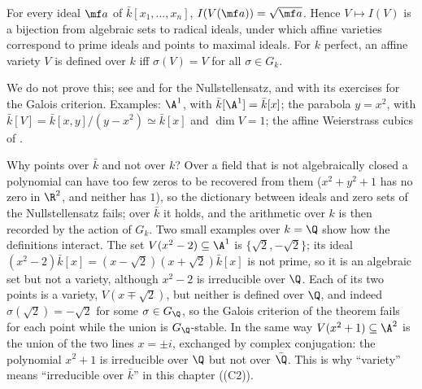 \begin{theorem}\label{thm:curves:nullstellensatz}
For every ideal $\mf a$ of $\bar k[x_1,\dots,x_n]$, $I(V(\mf a))=\sqrt{\mf a}$. Hence $V\mapsto I(V)$ is a bijection from algebraic sets to radical ideals, under
which affine varieties correspond to prime ideals and points to maximal ideals. For $k$ perfect, an affine variety $V$ is defined over $k$ iff
$\sigma(V)=V$ for all $\sigma\in G_k$.
\end{theorem}

We do not prove this; see \cite[Chapter 1]{Fulton} and \cite[Chapter I, Section 1]{Hartshorne} for the Nullstellensatz, and
\cite[Chapter I, Section 1]{SilvermanAEC} with its exercises for the Galois criterion. Examples: $\A^1$, with $\bar k[\A^1]=\bar k[x]$; the
parabola $y=x^2$, with $\bar k[V]=\bar k[x,y]/(y-x^2)\simeq\bar k[x]$ and $\dim V=1$; the affine Weierstrass cubics of .

Why points over $\bar k$ and not over $k$? Over a field that is not algebraically closed a polynomial can have too few zeros to be
recovered from them ($x^2+y^2+1$ has no zero in $\R^2$, and neither has $1$), so the dictionary between ideals and zero sets of the Nullstellensatz fails;
over $\bar k$ it holds, and the arithmetic over $k$ is then recorded by the action of $G_k$. Two small examples over $k=\Q$ show how the
definitions interact. The set $V(x^2-2)\subseteq\A^1$ is $\{\sqrt2,-\sqrt2\}$; its ideal $(x^2-2)\bar k[x]=(x-\sqrt2)(x+\sqrt2)\bar k[x]$ is not prime, so it is an
algebraic set but not a variety, although $x^2-2$ is irreducible over $\Q$. Each of its two points is a variety, $V(x\mp\sqrt2)$, but neither is defined over
$\Q$, and indeed $\sigma(\sqrt2)=-\sqrt2$ for some $\sigma\in G_\Q$, so the Galois criterion of the theorem fails for each point while the union is $G_\Q$-stable. In the
same way $V(x^2+1)\subseteq\A^2$ is the union of the two lines $x=\pm i$, exchanged by complex conjugation: the polynomial $x^2+1$ is irreducible over $\Q$ but
not over $\bar\Q$. This is why ``variety'' means ``irreducible over $\bar k$'' in this chapter ((C2)).

